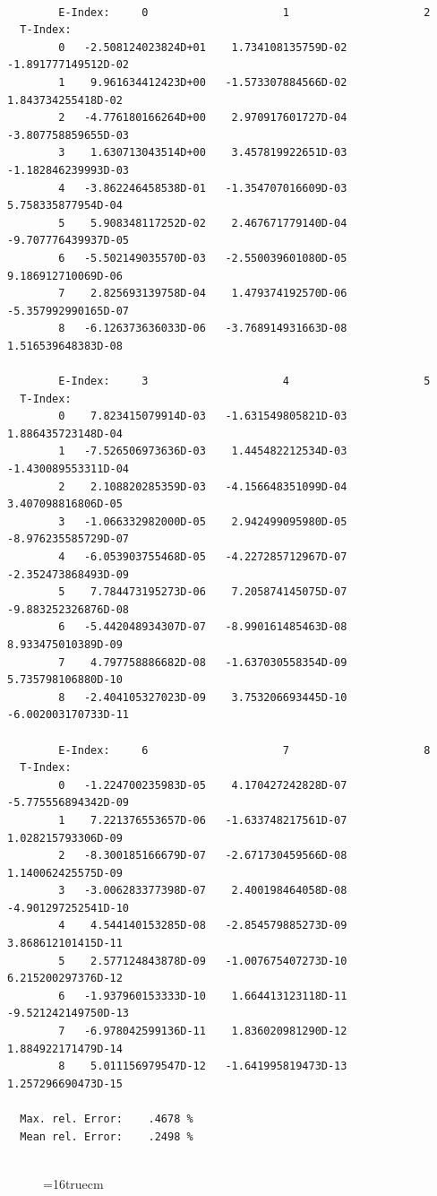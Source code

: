 \documentclass[12pt,dvips]{article}
\begin{document}
\begin{small}\begin{verbatim}

        E-Index:     0                     1                     2
  T-Index:
        0   -2.508124023824D+01    1.734108135759D-02   -1.891777149512D-02
        1    9.961634412423D+00   -1.573307884566D-02    1.843734255418D-02
        2   -4.776180166264D+00    2.970917601727D-04   -3.807758859655D-03
        3    1.630713043514D+00    3.457819922651D-03   -1.182846239993D-03
        4   -3.862246458538D-01   -1.354707016609D-03    5.758335877954D-04
        5    5.908348117252D-02    2.467671779140D-04   -9.707776439937D-05
        6   -5.502149035570D-03   -2.550039601080D-05    9.186912710069D-06
        7    2.825693139758D-04    1.479374192570D-06   -5.357992990165D-07
        8   -6.126373636033D-06   -3.768914931663D-08    1.516539648383D-08

        E-Index:     3                     4                     5
  T-Index:
        0    7.823415079914D-03   -1.631549805821D-03    1.886435723148D-04
        1   -7.526506973636D-03    1.445482212534D-03   -1.430089553311D-04
        2    2.108820285359D-03   -4.156648351099D-04    3.407098816806D-05
        3   -1.066332982000D-05    2.942499095980D-05   -8.976235585729D-07
        4   -6.053903755468D-05   -4.227285712967D-07   -2.352473868493D-09
        5    7.784473195273D-06    7.205874145075D-07   -9.883252326876D-08
        6   -5.442048934307D-07   -8.990161485463D-08    8.933475010389D-09
        7    4.797758886682D-08   -1.637030558354D-09    5.735798106880D-10
        8   -2.404105327023D-09    3.753206693445D-10   -6.002003170733D-11

        E-Index:     6                     7                     8
  T-Index:
        0   -1.224700235983D-05    4.170427242828D-07   -5.775556894342D-09
        1    7.221376553657D-06   -1.633748217561D-07    1.028215793306D-09
        2   -8.300185166679D-07   -2.671730459566D-08    1.140062425575D-09
        3   -3.006283377398D-07    2.400198464058D-08   -4.901297252541D-10
        4    4.544140153285D-08   -2.854579885273D-09    3.868612101415D-11
        5    2.577124843878D-09   -1.007675407273D-10    6.215200297376D-12
        6   -1.937960153333D-10    1.664413123118D-11   -9.521242149750D-13
        7   -6.978042599136D-11    1.836020981290D-12    1.884922171479D-14
        8    5.011156979547D-12   -1.641995819473D-13    1.257296690473D-15

  Max. rel. Error:    .4678 %
  Mean rel. Error:    .2498 %


\end{verbatim}\end{small}
\begin{figure} \label{2.1.5i}
\epsfxsize=16truecm
\end{figure}
\newpage
\end{document}
